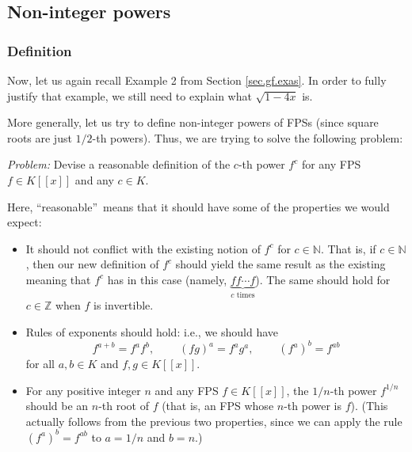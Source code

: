 \subsection{\label{sec.gf.nips}Non-integer powers}

\subsubsection{Definition}

Now, let us again recall Example 2 from Section \ref{sec.gf.exas}. In order to
fully justify that example, we still need to explain what $\sqrt{1-4x}$ is.

More generally, let us try to define non-integer powers of FPSs (since square
roots are just $1/2$-th powers). Thus, we are trying to solve the following problem:

\begin{statement}
\textit{Problem:} Devise a reasonable definition of the $c$-th power $f^{c}$
for any FPS $f\in K\left[  \left[  x\right]  \right]  $ and any $c\in K$.
\end{statement}

Here, \textquotedblleft reasonable\textquotedblright\ means that it should
have some of the properties we would expect:

\begin{itemize}
\item It should not conflict with the existing notion of $f^{c}$ for
$c\in\mathbb{N}$. That is, if $c\in\mathbb{N}$, then our new definition of
$f^{c}$ should yield the same result as the existing meaning that $f^{c}$ has
in this case (namely, $\underbrace{ff\cdots f}_{c\text{ times}}$). The same
should hold for $c\in\mathbb{Z}$ when $f$ is invertible.

\item Rules of exponents should hold: i.e., we should have%
\begin{equation}
f^{a+b}=f^{a}f^{b},\ \ \ \ \ \ \ \ \ \ \left(  fg\right)  ^{a}=f^{a}%
g^{a},\ \ \ \ \ \ \ \ \ \ \left(  f^{a}\right)  ^{b}=f^{ab}
\label{eq.sec.gf.nips.rules-of-exps}%
\end{equation}
for all $a,b\in K$ and $f,g\in K\left[  \left[  x\right]  \right]  $.

\item For any positive integer $n$ and any FPS $f\in K\left[  \left[
x\right]  \right]  $, the $1/n$-th power $f^{1/n}$ should be an $n$-th root of
$f$ (that is, an FPS whose $n$-th power is $f$). (This actually follows from
the previous two properties, since we can apply the rule $\left(
f^{a}\right)  ^{b}=f^{ab}$ to $a=1/n$ and $b=n$.)
\end{itemize}

